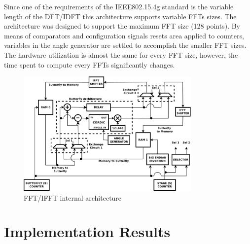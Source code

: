 Since one of the requirements of the IEEE802.15.4g standard is the variable length of the DFT/IDFT this architecture supports variable FFTs sizes. The architecture was designed to support the maximum FFT size (128 points). By means of comparators and configuration signals resets area applied to counters, variables in the angle generator are settled to accomplish the smaller FFT sizes. The hardware utilization is almost the same for every FFT size, however, the time spent to compute every FFTs significantly changes.

\begin{figure}[htb!]
\centering
\includegraphics[width=0.8\textwidth]{./figures/fft_architecture_v2.pdf}
\vspace{-0.2 cm}
\caption{FFT/IFFT internal architecture}
\label{fig:internal_architecture}
\end{figure} 






\section{Implementation Results}
\label{Implem_Results}


